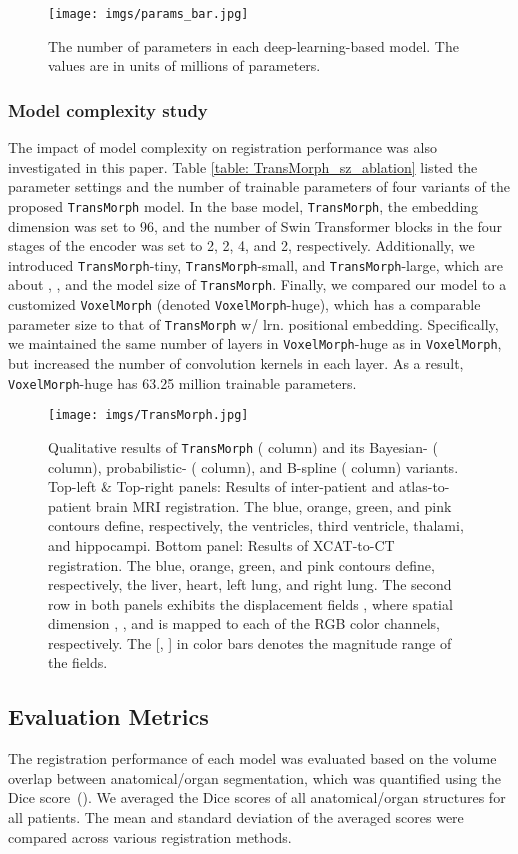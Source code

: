 \documentclass[times,twocolumn,final]{elsarticle}
\begin{document}
\begin{figure}[!t]
\centering
\texttt{[image: imgs/params\_bar.jpg]}
\caption{The number of parameters in each deep-learning-based model. The values are in units of millions of parameters.\label{fig:model_params}}
\end{figure}
\subsubsection{Model complexity study}
The impact of model complexity on registration performance was also investigated in this paper. Table \ref{table: TransMorph_sz_ablation} listed the parameter settings and the number of trainable parameters of four variants of the proposed \texttt{TransMorph} model. In the base model, \texttt{TransMorph}, the embedding dimension  was set to 96, and the number of Swin Transformer blocks in the four stages of the encoder was set to 2, 2, 4, and 2, respectively. Additionally, we introduced \texttt{TransMorph}-tiny, \texttt{TransMorph}-small, and \texttt{TransMorph}-large, which are about , , and  the model size of \texttt{TransMorph}. Finally, we compared our model to a customized \texttt{VoxelMorph} (denoted \texttt{VoxelMorph}-huge), which has a comparable parameter size to that of \texttt{TransMorph} w/ lrn. positional embedding. Specifically, we maintained the same number of layers in \texttt{VoxelMorph}-huge as in \texttt{VoxelMorph}, but increased the number of convolution kernels in each layer. As a result, \texttt{VoxelMorph}-huge has 63.25 million trainable parameters.
\begin{figure*}[!t]
\centering
\texttt{[image: imgs/TransMorph.jpg]}
\caption{Qualitative results of \texttt{TransMorph} ( column) and its Bayesian- ( column), probabilistic- ( column), and B-spline ( column) variants. Top-left \& Top-right panels: Results of inter-patient and atlas-to-patient brain MRI registration. The blue, orange, green, and pink contours define, respectively, the ventricles, third ventricle, thalami, and hippocampi. Bottom panel: Results of XCAT-to-CT registration. The blue, orange, green, and pink contours define, respectively, the liver, heart, left lung, and right lung. The second row in both panels exhibits the displacement fields , where spatial dimension , , and  is mapped to each of the RGB color channels, respectively. The [, ] in color bars denotes the magnitude range of the fields. \label{fig:brain_xcat_transmorph}}
\end{figure*}
\subsection{Evaluation Metrics}
The registration performance of each model was evaluated based on the volume overlap between anatomical/organ segmentation, which was quantified using the Dice score~(\cite{dice1945measures}). We averaged the Dice scores of all anatomical/organ structures for all patients. The mean and standard deviation of the averaged scores were compared across various registration methods. 
\end{document}
